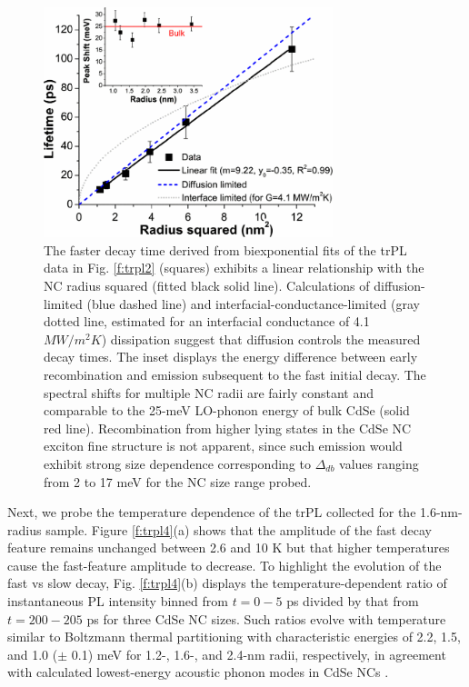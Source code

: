 \begin{figure}
\begin{center}
\includegraphics[width=0.75\textwidth]{./Chapter4/trpl3.png}
\caption[Fast pholuminescence feature lifetimes as a function of CdSe nanocrystal radius.]{The faster decay time derived from biexponential fits of the trPL data in Fig. \ref{f:trpl2} (squares) exhibits a linear relationship with the NC radius squared (fitted black solid line). Calculations of diffusion-limited (blue dashed line) and interfacial-conductance-limited (gray dotted line, estimated for an interfacial conductance of 4.1 $MW/m^2K$) dissipation suggest that diffusion controls the measured decay times. The inset displays the energy difference between early recombination and emission subsequent to the fast initial decay. The spectral shifts for multiple NC radii are fairly constant and comparable to the 25-meV LO-phonon energy of bulk CdSe (solid red line). Recombination from higher lying states in the CdSe NC exciton fine structure is not apparent, since such emission would exhibit strong size dependence corresponding to $\Delta_{db}$ values ranging from 2 to 17 meV for the NC size range probed.}
\label{f:trpl3}
\end{center}
\end{figure}

Next, we probe the temperature dependence of the trPL collected for the 1.6-nm-radius sample.  Figure \ref{f:trpl4}(a) shows that the amplitude of the fast decay feature remains unchanged between 2.6 and 10 K but that higher temperatures cause the fast-feature amplitude to decrease. To highlight the evolution of the fast vs slow decay, Fig. \ref{f:trpl4}(b) displays the temperature-dependent ratio of instantaneous PL intensity binned from $t = 0 - 5$ ps divided by that from $t = 200 - 205$ ps for three CdSe NC sizes. Such ratios evolve with temperature similar to Boltzmann thermal partitioning with characteristic energies of 2.2, 1.5, and 1.0 ($\pm$ 0.1) meV for 1.2-, 1.6-, and 2.4-nm radii, respectively, in agreement with calculated lowest-energy acoustic phonon modes in CdSe NCs \cite{PhysRevLett.102.177402, doi:10.1021/nl061414e}. \par

